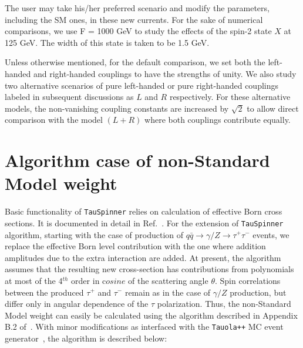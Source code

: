 \documentclass[12pt]{article}
\begin{document}
The user may take his/her preferred scenario and modify the parameters, including the SM ones, in these new currents.
For the sake of numerical comparisons, we use F = 1000 GeV to study the effects of the spin-2 state $X$ at 125 GeV.
The width of this state is taken to be 1.5 GeV.

Unless otherwise mentioned, for the default comparison, we set both the left-handed and right-handed couplings to have the  strengths of unity.
We also study two alternative scenarios of pure left-handed or pure right-handed couplings labeled in subsequent discussions as $L$ and $R$ respectively.
For these alternative models, the non-vanishing coupling constants are increased by $\sqrt{2}$ 
to allow direct comparison with the model $(L+R)$ where both couplings contribute equally.

\section{Algorithm case of  non-Standard Model weight}

Basic functionality of {\tt TauSpinner} relies on calculation of effective Born cross sections. It is documented in detail in Ref.~\cite{Czyczula:2012ny}. 
For the extension of {\tt TauSpinner} algorithm, starting with the case of production of $q \bar q \to \gamma/Z \to \tau^+\tau^-$ events,  
we replace the effective Born level contribution with the one where addition amplitudes due to the extra interaction are added. 
At present, the algorithm assumes that the resulting new cross-section has contributions 
from polynomials at most of the 4$^{th}$ order in $\mathrm cosine$ of the scattering angle $\theta$.
Spin correlations between the produced $\tau^+$ and $\tau^-$ remain as in the case of $\gamma/Z$ production, but differ only in angular dependence of the $\tau$ polarization.
Thus, the non-Standard Model weight can easily be calculated using the algorithm described in Appendix B.2 of~\cite{Czyczula:2012ny}.
With minor modifications as interfaced with the {\tt Tauola++} MC event generator~\cite{Davidson:2010rw}, the algorithm is described below:
\end{document}
